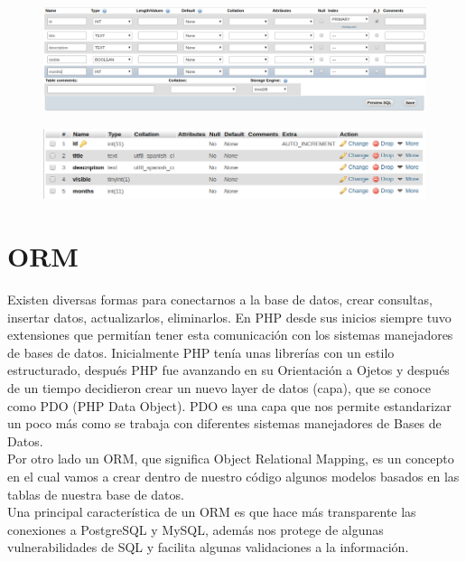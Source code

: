 \documentclass{article}
\begin{document}
\begin{figure}[h!]
  \centering
  \includegraphics[scale=0.5]{./Pictures/067_campos_jobs.png}
\end{figure}

\begin{figure}[h!]
  \centering
  \includegraphics[scale=0.5]{./Pictures/068_jobs.png}
\end{figure}


\section{ORM}%
Existen diversas formas para conectarnos a la base de datos, crear consultas,
insertar datos, actualizarlos, eliminarlos. En PHP desde sus inicios siempre
tuvo extensiones que permitían tener esta comunicación con los sistemas
manejadores de bases de datos. Inicialmente PHP tenía unas librerías con un
estilo estructurado, después PHP fue avanzando en su Orientación a Ojetos y
después de un tiempo decidieron crear un nuevo layer de datos (capa), que se
conoce como PDO (PHP Data Object). PDO es una capa que nos permite estandarizar
un poco más como se trabaja con diferentes sistemas manejadores de Bases de
Datos.\\

Por otro lado un ORM, que significa Object Relational Mapping, es un concepto
en el cual vamos a crear dentro de nuestro código algunos modelos basados en
las tablas de nuestra base de datos.\\

Una principal característica de un ORM es que hace más transparente las
conexiones a PostgreSQL y MySQL, además nos protege de algunas vulnerabilidades
de SQL y facilita algunas validaciones a la información.\\

\newpage
\end{document}
